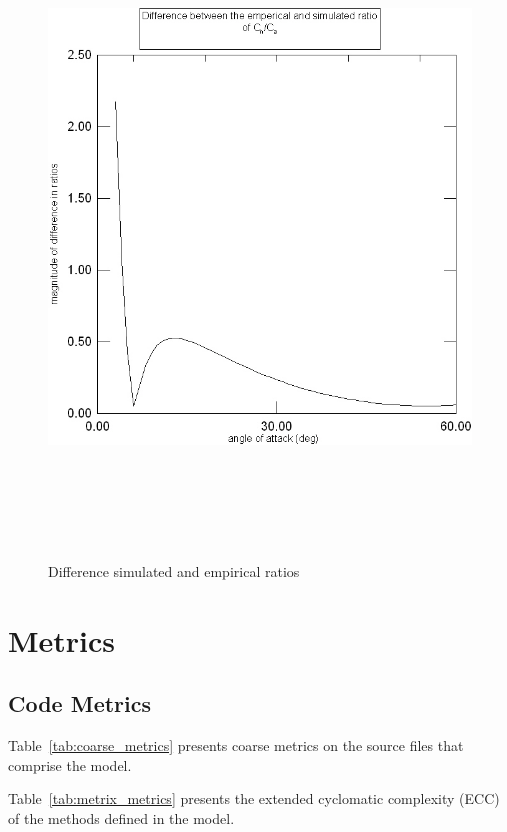 \begin{description}
\begin{figure}[H]
\includegraphics [height=175mm]{figs/ratiodiff.jpg}
\caption{Difference simulated and empirical ratios}
\label{fig:13}
\end{figure}
\end{description}

\section{Metrics}
\subsection{Code Metrics}

Table~\ref{tab:coarse_metrics} presents coarse metrics on the
source files that comprise the model.



Table~\ref{tab:metrix_metrics} presents the extended cyclomatic
complexity
(ECC) of the methods defined in the model.



